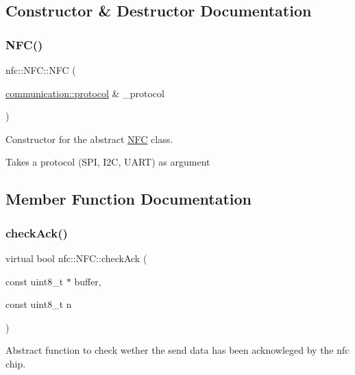 \subsection{Constructor \& Destructor Documentation}
\mbox{\label{classnfc_1_1NFC_a6ebeb8952cb8be604ef33d4188f86303}} 
\subsubsection{\texorpdfstring{N\+F\+C()}{NFC()}}
{\footnotesize\ttfamily nfc\+::\+N\+F\+C\+::\+N\+FC (\begin{DoxyParamCaption}\item[{\hyperlink{classcommunication_1_1protocol}{communication\+::protocol} \&}]{\+\_\+protocol }\end{DoxyParamCaption})\hspace{0.3cm}{\ttfamily [inline]}}



Constructor for the abstract \hyperlink{classnfc_1_1NFC}{N\+FC} class. 

Takes a protocol (S\+PI, I2C, U\+A\+RT) as argument 

\subsection{Member Function Documentation}
\mbox{\label{classnfc_1_1NFC_a9d859ed12251d6d553d9f5c09bbb10ef}} 
\subsubsection{\texorpdfstring{check\+Ack()}{checkAck()}}
{\footnotesize\ttfamily virtual bool nfc\+::\+N\+F\+C\+::check\+Ack (\begin{DoxyParamCaption}\item[{const uint8\+\_\+t $\ast$}]{buffer,  }\item[{const uint8\+\_\+t}]{n }\end{DoxyParamCaption})\hspace{0.3cm}{\ttfamily [pure virtual]}}



Abstract function to check wether the send data has been acknowleged by the nfc chip. 


